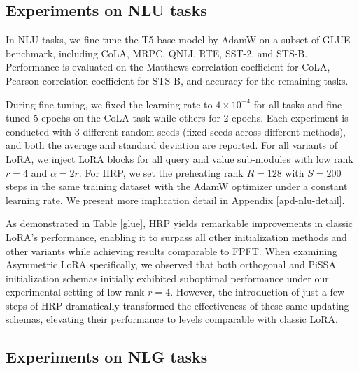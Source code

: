 \subsection{Experiments on NLU tasks}

In NLU tasks, we fine-tune the T5-base model \cite{2020t5} by AdamW \cite{loshchilov2019decoupledweightdecayregularization} on a subset of GLUE \cite{wang2018glue} benchmark, including CoLA, MRPC, QNLI, RTE, SST-2, and STS-B. Performance is evaluated on the Matthews correlation coefficient for CoLA, Pearson correlation coefficient for STS-B, and accuracy for the remaining tasks. 

During fine-tuning, we fixed the learning rate to $4\times 10^{-4}$ for all tasks and fine-tuned 5 epochs on the CoLA task while others for 2 epochs. Each experiment is conducted with 3 different random seeds (fixed seeds across different methods), and both the average and standard deviation are reported. For all variants of LoRA, we inject LoRA blocks for all query and value sub-modules with low rank $r=4$ and $\alpha=2r$. For HRP, we set the preheating rank $R=128$ with $S=200$ steps in the same training dataset with the AdamW optimizer under a constant learning rate.  We present more implication detail in Appendix \ref{apd-nlu-detail}. 


As demonstrated in Table \ref{glue}, HRP yields remarkable improvements in classic LoRA's performance, enabling it to surpass all other initialization methods and other variants while achieving results comparable to FPFT. When examining Asymmetric LoRA specifically, we observed that both orthogonal and PiSSA initialization schemas initially exhibited suboptimal performance under our experimental setting of low rank $r=4$. However, the introduction of just a few steps of HRP dramatically transformed the effectiveness of these same updating schemas, elevating their performance to levels comparable with classic LoRA.

\subsection{Experiments on NLG tasks}

